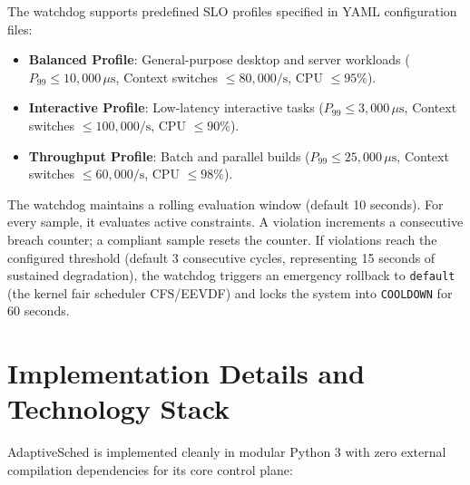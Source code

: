 \documentclass[journal]{IEEEtran}
\begin{document}
The watchdog supports predefined SLO profiles specified in YAML configuration files:
\begin{itemize}
    \item \textbf{Balanced Profile}: General-purpose desktop and server workloads ($P_{99} \le 10,000\,\mu\text{s}$, Context switches $\le 80,000/\text{s}$, CPU $\le 95\%$).
    \item \textbf{Interactive Profile}: Low-latency interactive tasks ($P_{99} \le 3,000\,\mu\text{s}$, Context switches $\le 100,000/\text{s}$, CPU $\le 90\%$).
    \item \textbf{Throughput Profile}: Batch and parallel builds ($P_{99} \le 25,000\,\mu\text{s}$, Context switches $\le 60,000/\text{s}$, CPU $\le 98\%$).
\end{itemize}

The watchdog maintains a rolling evaluation window (default 10 seconds). For every sample, it evaluates active constraints. A violation increments a consecutive breach counter; a compliant sample resets the counter. If violations reach the configured threshold (default 3 consecutive cycles, representing 15 seconds of sustained degradation), the watchdog triggers an emergency rollback to \texttt{default} (the kernel fair scheduler CFS/EEVDF) and locks the system into \texttt{COOLDOWN} for 60 seconds.

\section{Implementation Details and Technology Stack}
\label{sec:impl}

AdaptiveSched is implemented cleanly in modular Python 3 with zero external compilation dependencies for its core control plane:
\end{document}
